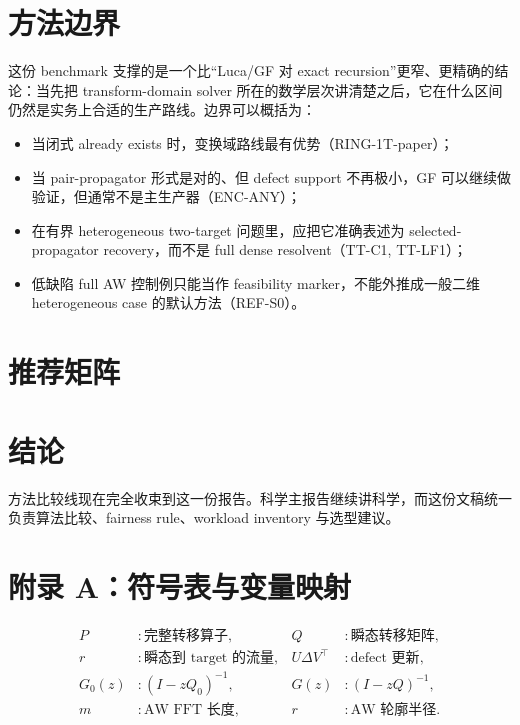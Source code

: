 \documentclass[11pt]{ctexart}
\newcommand{\TabDir}{../artifacts/tables}
\begin{document}
\section{方法边界}
这份 benchmark 支撑的是一个比“Luca/GF 对 exact recursion”更窄、更精确的结论：当先把 transform-domain solver 所在的数学层次讲清楚之后，它在什么区间仍然是实务上合适的生产路线。边界可以概括为：
\begin{itemize}[leftmargin=1.4em]
\item 当闭式 already exists 时，变换域路线最有优势（RING-1T-paper）；
\item 当 pair-propagator 形式是对的、但 defect support 不再极小，GF 可以继续做验证，但通常不是主生产器（ENC-ANY）；
\item 在有界 heterogeneous two-target 问题里，应把它准确表述为 selected-propagator recovery，而不是 full dense resolvent（TT-C1, TT-LF1）；
\item 低缺陷 full AW 控制例只能当作 feasibility marker，不能外推成一般二维 heterogeneous case 的默认方法（REF-S0）。
\end{itemize}
\section{推荐矩阵}
\begin{table}[H]
\centering\small
\resizebox{\linewidth}{!}{%

}
\caption{由六个 workload benchmark 导出的推荐矩阵。}
\end{table}
\section{结论}
方法比较线现在完全收束到这一份报告。科学主报告继续讲科学，而这份文稿统一负责算法比较、fairness rule、workload inventory 与选型建议。
\clearpage
\appendix
\section{附录 A：符号表与变量映射}
\begin{align}
P &: \text{完整转移算子}, & Q &: \text{瞬态转移矩阵},\\
r &: \text{瞬态到 target 的流量}, & U\Delta V^{\top} &: \text{defect 更新},\\
G_0(z) &: (I-zQ_0)^{-1}, & G(z) &: (I-zQ)^{-1},\\
m &: \text{AW FFT 长度}, & r &: \text{AW 轮廓半径}.
\end{align}
\end{document}
